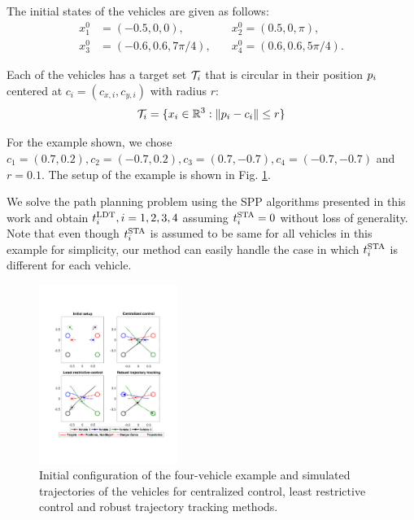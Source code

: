 The initial states of the vehicles are given as follows:
\begin{equation}
\begin{aligned}
x_1^0 &= (-0.5, 0, 0), \quad &x_2^0 = (0.5, 0, \pi), \\
x_3^0 &= \left(-0.6, 0.6, 7\pi/4\right), \quad &x_4^0 = \left(0.6, 0.6, 5\pi/4\right).
\end{aligned}
\end{equation}

\noindent Each of the vehicles has a target set $\mathcal{T}_i$ that is circular in their position $p_i$ centered at $c_i = (c_{x,i}, c_{y,i})$ with radius $r$:
\vspace{-0.2em}
\begin{equation}
\mathcal{T}_i = \{x_i \in \mathbb{R}^3: \|p_i - c_i\| \le r\}
\end{equation}

\noindent For the example shown, we chose $c_1 = (0.7, 0.2), c_2 = (-0.7, 0.2), c_3 = (0.7, -0.7), c_4 = (-0.7, -0.7)$ and $r = 0.1$. The setup of the example is shown in Fig. \ref{fig:allTrajs}.

We solve the path planning problem using the SPP algorithms presented in this work and obtain $t^\text{LDT}_i, i=1,2,3,4$ assuming $t^\text{STA}_i=0$ without loss of generality. Note that even though $t^\text{STA}_i$ is assumed to be same for all vehicles in this example for simplicity, our method can easily handle the case in which $t^\text{STA}_i$ is different for each vehicle.
\begin{figure}
  \centering
  \includegraphics[width=0.4\textwidth]{"fig/allTrajs"}
  \caption{Initial configuration of the four-vehicle example and simulated trajectories of the vehicles for centralized control, least restrictive control and robust trajectory tracking methods.}
  \label{fig:allTrajs}
  \vspace{-2em}
\end{figure}

